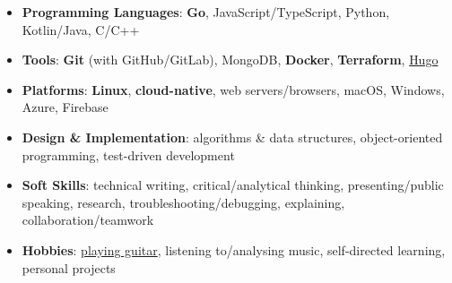 \documentclass[
	a4paper,
	10pt,
	roman,
	colorlinks,
	linkcolor = purple,
	filecolor = purple,
	citecolor = blue,
	urlcolor = blue
]{moderncv}
\begin{document}

	\begin{itemize}
		\item \textbf{Programming Languages}: \textbf{Go}, JavaScript/TypeScript, Python, Kotlin/Java, C/C++
		\item \textbf{Tools}: \textbf{Git} (with GitHub/GitLab), MongoDB, \textbf{Docker}, \textbf{Terraform}, \href{https://gohugo.io}{Hugo}
		\item \textbf{Platforms}: \textbf{Linux}, \textbf{cloud-native}, web servers/browsers, macOS, Windows, Azure, Firebase
		\item \textbf{Design \& Implementation}: algorithms \& data structures, object-oriented programming, test-driven development
		\item \textbf{Soft Skills}: technical writing, critical/analytical thinking, presenting/public speaking, research, troubleshooting/debugging, explaining, collaboration/teamwork
		\item \textbf{Hobbies}: \href{https://applegamer22.github.io/about/#hobbies}{playing guitar}, listening to/analysing music, self-directed learning, personal projects
	\end{itemize}
\end{document}
